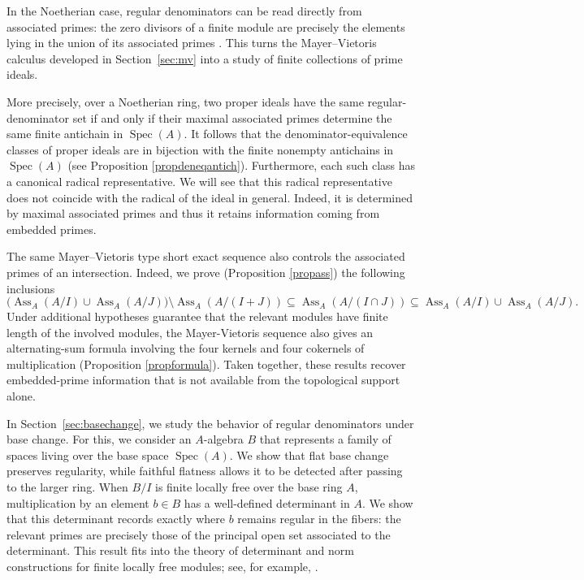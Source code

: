 \documentclass[11pt,leqno]{amsart}
\theoremstyle{definition}
\numberwithin{equation}{section}
\DeclareMathOperator{\Spec}{Spec}
\DeclareMathOperator{\Ass}{Ass}
\begin{document}
In the Noetherian case, regular denominators can be read directly from associated primes: the zero divisors of a finite module are precisely the elements lying in the union of its associated primes \cite[Theorem~6.1(ii), p.~38]{Mat86}. This turns the Mayer--Vietoris calculus developed in Section~\ref{sec:mv} into a study of finite collections of prime ideals.

More precisely, over a Noetherian ring, two proper ideals have the
same regular-denominator set if and only if their maximal associated
primes determine the same finite antichain in $\Spec(A)$. It follows that the denominator-equivalence classes of proper ideals are in bijection with the finite nonempty antichains in $\Spec(A)$ (see Proposition \ref{propdeneqantich}). Furthermore, each such class has a canonical radical representative. We will see that this radical representative does not coincide with the radical of the ideal in general. Indeed, it is determined by maximal associated primes and thus it retains information coming from embedded primes.

The same Mayer--Vietoris type short exact sequence also controls the associated primes of an intersection. Indeed, we prove (Proposition \ref{propass}) the following inclusions 
$$
\bigl(\Ass_A(A/I)\cup\Ass_A(A/J)\bigr)
\setminus\Ass_A(A/(I+J))
\subseteq
\Ass_A(A/(I\cap J))
\subseteq
\Ass_A(A/I)\cup\Ass_A(A/J).
$$
Under additional hypotheses guarantee that the relevant modules have finite length of the involved modules, the Mayer-Vietoris sequence also gives an alternating-sum formula involving the four kernels and four cokernels of multiplication (Proposition \ref{propformula}). Taken together, these results recover embedded-prime information that is not available from the topological support alone.

In Section~\ref{sec:basechange}, we study the behavior of regular denominators under base change. For this, we consider an $A$-algebra $B$ that represents a family of spaces living over the base space $\Spec(A)$. We show that flat base change preserves regularity, while faithful flatness allows it to be detected after passing to the larger ring. 
When $B/I$ is finite locally free over the base ring $A$, multiplication by an element $b\in B$ has a well-defined determinant in $A$. We show that this determinant records exactly where $b$ remains regular in the fibers: the relevant primes are precisely those of the principal open set associated to the determinant. This result fits into the theory of determinant and norm constructions for finite locally free modules; see, for example, \cite{KM76,Fer98}.
\end{document}
